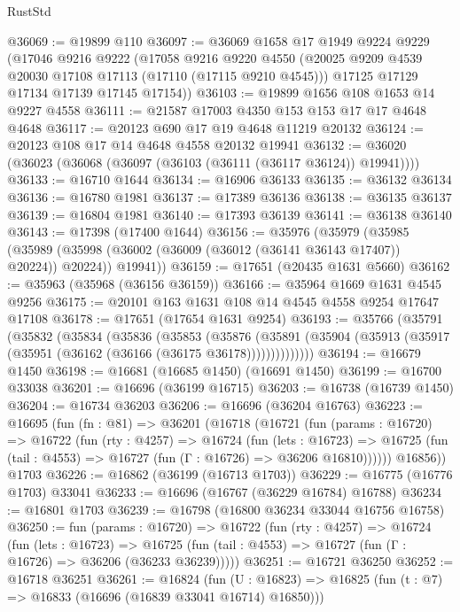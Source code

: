 \begin{lexlean}{RustStd}
\begin{coremodule}
@36069 := @19899 @110
@36097 := @36069
    @1658
    @17
    @1949
    @9224
    @9229
    (@17046
      @9216
      @9222
      (@17058
        @9216
        @9220
        @4550
        (@20025 @9209 @4539 @20030 @17108 @17113 (@17110 (@17115 @9210 @4545)))
        @17125
        @17129
        @17134
        @17139
        @17145
        @17154))
@36103 := @19899 @1656 @108 @1653 @14 @9227 @4558
@36111 := @21587 @17003 @4350 @153 @153 @17 @17 @4648 @4648
@36117 := @20123 @690 @17 @19 @4648 @11219 @20132
@36124 := @20123 @108 @17 @14 @4648 @4558 @20132 @19941
@36132 := @36020 (@36023 (@36068 (@36097 (@36103 (@36111 (@36117 @36124)) @19941))))
@36133 := @16710 @1644
@36134 := @16906 @36133
@36135 := @36132 @36134
@36136 := @16780 @1981
@36137 := @17389 @36136
@36138 := @36135 @36137
@36139 := @16804 @1981
@36140 := @17393 @36139
@36141 := @36138 @36140
@36143 := @17398 (@17400 @1644)
@36156 := @35976
    (@35979
      (@35985
        (@35989 (@35998 (@36002 (@36009 (@36012 (@36141 @36143 @17407)) @20224)) @20224))
        @19941))
@36159 := @17651 (@20435 @1631 @5660)
@36162 := @35963 (@35968 (@36156 @36159))
@36166 := @35964 @1669 @1631 @4545 @9256
@36175 := @20101 @163 @1631 @108 @14 @4545 @4558 @9254 @17647 @17108
@36178 := @17651 (@17654 @1631 @9254)
@36193 := @35766
    (@35791
      (@35832
        (@35834
          (@35836
            (@35853
              (@35876
                (@35891 (@35904 (@35913 (@35917 (@35951 (@36162 (@36166 (@36175 @36178))))))))))))))
@36194 := @16679 @1450
@36198 := @16681 (@16685 @1450) (@16691 @1450)
@36199 := @16700 @33038
@36201 := @16696 (@36199 @16715)
@36203 := @16738 (@16739 @1450)
@36204 := @16734 @36203
@36206 := @16696 (@36204 @16763)
@36223 := @16695
    (fun (fn : @81) =>
    @36201
      (@16718
        (@16721
          (fun (params : @16720) =>
          @16722
            (fun (rty : @4257) =>
            @16724
              (fun (lets : @16723) =>
              @16725 (fun (tail : @4553) => @16727 (fun (Γ : @16726) => @36206 @16810))))))
        @16856))
    @1703
@36226 := @16862 (@36199 (@16713 @1703))
@36229 := @16775 (@16776 @1703) @33041
@36233 := @16696 (@16767 (@36229 @16784) @16788)
@36234 := @16801 @1703
@36239 := @16798 (@16800 @36234 @33044 @16756 @16758)
@36250 := fun (params : @16720) =>
  @16722
    (fun (rty : @4257) =>
    @16724
      (fun (lets : @16723) =>
      @16725 (fun (tail : @4553) => @16727 (fun (Γ : @16726) => @36206 (@36233 @36239)))))
@36251 := @16721 @36250
@36252 := @16718 @36251
@36261 := @16824
    (fun (U : @16823) => @16825 (fun (t : @7) => @16833 (@16696 (@16839 @33041 @16714) @16850)))

\end{coremodule}
\end{lexlean}
